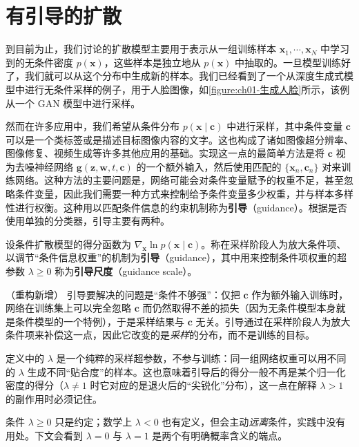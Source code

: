 \documentclass[../../main.tex]{subfiles}
\begin{document}
\section{有引导的扩散}\label{section:ch20-有引导的扩散}

到目前为止，我们讨论的扩散模型主要用于表示从一组训练样本 $\bm{x}_1,\cdots,\bm{x}_N$ 中学习到的无条件密度 $p(\bm{x})$，这些样本是独立地从 $p(\bm{x})$ 中抽取的。一旦模型训练好了，我们就可以从这个分布中生成新的样本。我们已经看到了一个从深度生成式模型中进行无条件采样的例子，用于人脸图像，如\cref{figure:ch01-生成人脸}所示，该例从一个 GAN 模型中进行采样。

然而在许多应用中，我们希望从条件分布 $p(\bm{x}\mid\bm{c})$ 中进行采样，其中条件变量 $\bm{c}$ 可以是一个类标签或是描述目标图像内容的文字。这也构成了诸如图像超分辨率、图像修复、视频生成等许多其他应用的基础。实现这一点的最简单方法是将 $\bm{c}$ 视为去噪神经网络 $\bm{g}(\bm{z},\bm{w},t,\bm{c})$ 的一个额外输入，然后使用匹配的 $\{\bm{x}_n,\bm{c}_n\}$ 对来训练网络。这种方法的主要问题是，网络可能会对条件变量赋予的权重不足，甚至忽略条件变量，因此我们需要一种方式来控制给予条件变量多少权重，并与样本多样性进行权衡。这种用以匹配条件信息的约束机制称为\textbf{引导}（guidance）。根据是否使用单独的分类器，引导主要有两种。

\begin{definition}[引导与引导尺度]\label{definition:ch20-引导}
设条件扩散模型的得分函数为 $\nabla_{\bm{x}}\ln p(\bm{x}\mid\bm{c})$。称在采样阶段人为放大条件项、以调节“条件信息权重”的机制为\textbf{引导}（guidance），其中用来控制条件项权重的超参数 $\lambda\geqslant0$ 称为\textbf{引导尺度}（guidance scale）。
\end{definition}

\begin{remark}（重构新增）
引导要解决的问题是“条件不够强”：仅把 $\bm{c}$ 作为额外输入训练时，网络在训练集上可以完全忽略 $\bm{c}$ 而仍然取得不差的损失（因为无条件模型本身就是条件模型的一个特例），于是采样结果与 $\bm{c}$ 无关。引导通过在采样阶段人为放大条件项来补偿这一点，因此它改变的是\emph{采样}的分布，而不是训练的目标。\par
定义中的 $\lambda$ 是一个纯粹的采样超参数，不参与训练：同一组网络权重可以用不同的 $\lambda$ 生成不同“贴合度”的样本。这也意味着引导后的得分一般不再是某个归一化密度的得分（$\lambda\neq1$ 时它对应的是退火后的“尖锐化”分布），这一点在解释 $\lambda>1$ 的副作用时必须记住。\par
条件 $\lambda\geqslant0$ 只是约定；数学上 $\lambda<0$ 也有定义，但会主动\emph{远离}条件，实践中没有用处。下文会看到 $\lambda=0$ 与 $\lambda=1$ 是两个有明确概率含义的端点。
\end{remark}
\end{document}
